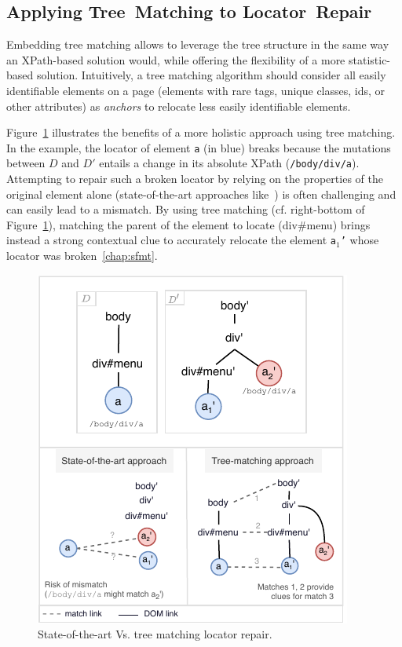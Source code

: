 \subsection{Applying Tree~Matching to Locator~Repair}
Embedding tree matching allows \erratum to leverage the tree structure in the same way an XPath-based solution would, while offering the flexibility of a more statistic-based solution.
Intuitively, a tree matching algorithm should consider all easily identifiable elements on a page (elements with rare tags, unique classes, ids, or other attributes) as \textit{anchors} to relocate less easily identifiable elements.

Figure~\ref{fig:holistic} illustrates the benefits of a more holistic approach using tree matching.
In the example, the locator of element \texttt{a} (in blue) breaks because the mutations between $D$ and $D'$ entails a change in its absolute XPath (\texttt{/body/div/a}).
Attempting to repair such a broken locator by relying on the properties of the original element alone (state-of-the-art approaches like~\cite{choudhary2011water,stocco2018visual}) is often challenging and can easily lead to a mismatch. 
By using tree matching (cf. right-bottom of Figure~\ref{fig:holistic}), matching the parent of the element to locate (\textsf{div\#menu}) brings instead a strong contextual clue to accurately relocate the element \texttt{a$_1$'} whose locator was broken~\ref{chap:sfmt}.

\begin{figure}[]
    \centering
    \includegraphics[width=.8\linewidth]{erratum/holistic}
    \caption{State-of-the-art Vs. tree matching locator repair.}
    \label{fig:holistic}
\end{figure}

